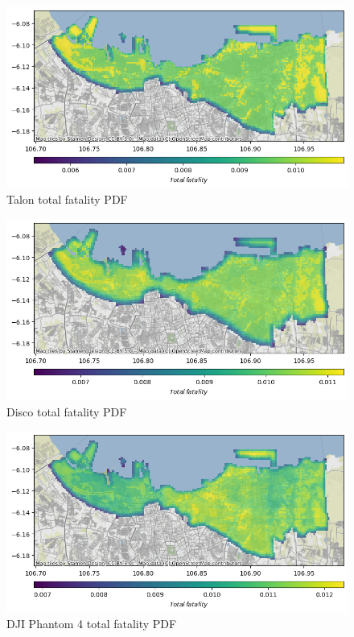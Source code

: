 \documentclass[12pt]{report}
\begin{document}
        \begin{figure}[H]
            \centering
            \includegraphics[width=\textwidth]{Plot/talon/total_fatality.png}
            \caption{Talon total fatality PDF}
        \end{figure}
        \begin{figure}[H]
            \centering
            \includegraphics[width=\textwidth]{Plot/parrot/total_fatality-pdf.png}
            \caption{Disco total fatality PDF}
        \end{figure}
        \begin{figure}[H]
            \centering
            \includegraphics[width=\textwidth]{Plot/phantom4/total_fatality_pdf.png}
            \caption{DJI Phantom 4 total fatality PDF}
        \end{figure}
\end{document}
